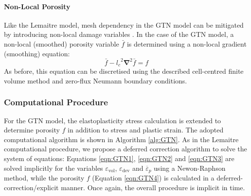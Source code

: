 \documentclass[sn-mathphys,Numbered]{sn-jnl}%
\newcommand{\bb}{\boldsymbol}
\begin{document}
\paragraph{Non-Local Porosity}

Like the Lemaitre model, mesh dependency in the GTN model can be mitigated by introducing non-local damage variables \cite{reusch_non-local_2003, leclerc_micromechanics-based_2020}.
In the case of the GTN model, a non-local (smoothed) porosity variable $\bar{f}$ is determined using a non-local gradient (smoothing) equation:
\begin{equation}
	\bar{f} - {l_c}^2 \bb{\nabla}^2 \bar{f} = f
\end{equation}
As before, this equation can be discretised using the described cell-centred finite volume method and zero-flux Neumann boundary conditions.



\subsubsection{Computational Procedure}

For the GTN model, the elastoplasticity stress calculation is extended to determine porosity $f$ in addition to stress and plastic strain.
The adopted computational algorithm is shown in Algorithm \ref{alg:GTN}.
As in the Lemaitre computational procedure, we propose a deferred correction algorithm to solve the system of equations:
Equations \ref{eqn:GTN1}, \ref{eqn:GTN2} and \ref{eqn:GTN3} are solved implicitly for the variables ${\varepsilon}_\text{vol}$, ${\varepsilon}_\text{dev}$ and $\overline{{\varepsilon}}_p$ using a Newon-Raphson method, while the porosity $f$ (Equation \ref{eqn:GTN4}) is calculated in a deferred-correction/explicit manner.
Once again, the overall procedure is implicit in time.
\end{document}
